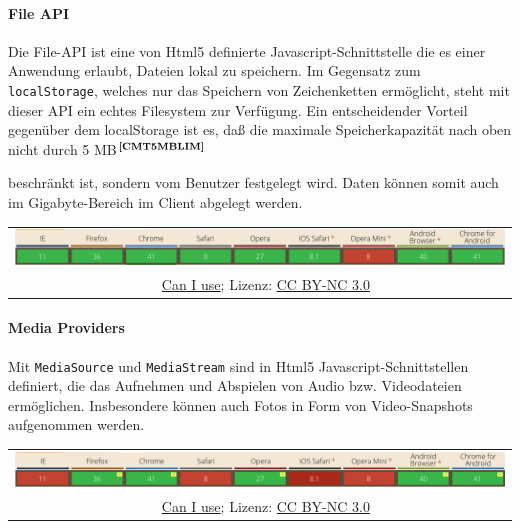 \paragraph{File API}
Die File-API ist eine von Html5 definierte Javascript-Schnittstelle die es einer Anwendung erlaubt, Dateien lokal zu speichern. Im Gegensatz zum \texttt{localStorage}, welches nur das Speichern von Zeichenketten ermöglicht, steht mit dieser API ein echtes Filesystem zur Verfügung. Ein entscheidender Vorteil gegenüber dem localStorage ist es, daß die maximale Speicherkapazität nach oben nicht durch 5 MB$^{\textbf{\ref{CMT5MBLIM}}}$%
\addtocounter{footnote}{1}%
 beschränkt ist, sondern vom Benutzer festgelegt wird. Daten können somit auch im Gigabyte-Bereich im Client abgelegt werden.
	\begin{table}[H]
  		\begin{adjustwidth}{-1.5cm}{1.5cm}
		\centering
		\begin{tabulary}{20cm}{C}
          	\includegraphics[scale=0.6]{bilder/screenshots/caniuse_fileapi.png}\\ 
				\ccLogo\ 
				\begingroup
    				\fontsize{8pt}{12pt}\selectfont
    				\href{http://caniuse.com/\#search=file\%20api}{Can I use}; Lizenz: \href{http://creativecommons.org/licenses/by-nc/3.0/}{CC BY-NC 3.0} 
				\endgroup
		\end{tabulary}
  		\end{adjustwidth}
	\end{table}

\paragraph{Media Providers}
Mit \texttt{MediaSource} und \texttt{MediaStream} sind in Html5 Javascript-Schnittstellen definiert, die das Aufnehmen und Abspielen von Audio bzw. Videodateien ermöglichen. Insbesondere können auch Fotos in Form von Video-Snapshots aufgenommen werden.
	\begin{table}[H]
  		\begin{adjustwidth}{-1.5cm}{1.5cm}
		\centering
		\begin{tabulary}{20cm}{C}
          	\includegraphics[scale=0.6]{bilder/screenshots/caniuse_mediastream.png}\\ 
				\ccLogo\ 
				\begingroup
    				\fontsize{8pt}{12pt}\selectfont
    				\href{http://caniuse.com/\#search=Media\%20Stream}{Can I use}; Lizenz: \href{http://creativecommons.org/licenses/by-nc/3.0/}{CC BY-NC 3.0} 
				\endgroup
		\end{tabulary}
  		\end{adjustwidth}
	\end{table}

